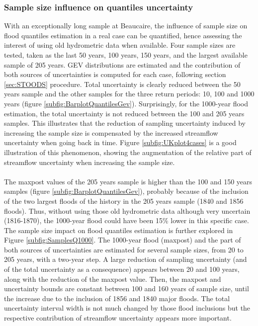 \documentclass[11pt]{article}
\begin{document}
        \subsubsection{Sample size influence on quantiles uncertainty}
        
        With an exceptionally long sample at Beaucaire, the influence of sample size on flood quantiles estimation in a real case can be quantified, hence assessing the interest of using old hydrometric data when available. Four sample sizes are tested, taken as the last 50 years, 100 years, 150 years, and the largest available sample of 205 years. GEV distributions are estimated and the contribution of both sources of uncertainties is computed for each case, following section \ref{sec:STOODS} procedure. Total uncertainty is clearly reduced between the 50 years sample and the other samples for the three return periods: 10, 100 and 1000 years (figure \ref{subfig:BarplotQuantilesGev}). Surprisingly, for the 1000-year flood estimation, the total uncertainty is not reduced between the 100 and 205 years samples. This illustrates that the reduction of sampling uncertainty induced by increasing the sample size is compensated by the increased streamflow uncertainty when going back in time. Figure \ref{subfig:UKplot4cases} is a good illustration of this phenomenon, showing the augmentation of the relative part of streamflow uncertainty when increasing the sample size.
        
        \paragraph{}
        The maxpost values of the 205 years sample is higher than the 100 and 150 years samples (figure \ref{subfig:BarplotQuantilesGev}), probably because of the inclusion of the two largest floods of the history in the 205 years sample (1840 and 1856 floods). Thus, without using those old hydrometric data although very uncertain (1816-1870), the 1000-year flood could have been 15\% lower in this specific case. The sample size impact on flood quantiles estimation is further explored in Figure \ref{subfig:SamplesQ1000}. The 1000-year flood (maxpost) and the part of both sources of uncertainties are estimated for several sample sizes, from 20 to 205 years, with a two-year step. A large reduction of sampling uncertainty (and of the total uncertainty as a consequence) appears between 20 and 100 years, along with the reduction of the maxpost value. Then, the maxpost and uncertainty bounds are constant between 100 and 160 years of sample size, until the increase due to the inclusion of 1856 and 1840 major floods. The total uncertainty interval width is not much changed by those flood inclusions but the respective contribution of streamflow uncertainty appears more important.
        
\end{document}
